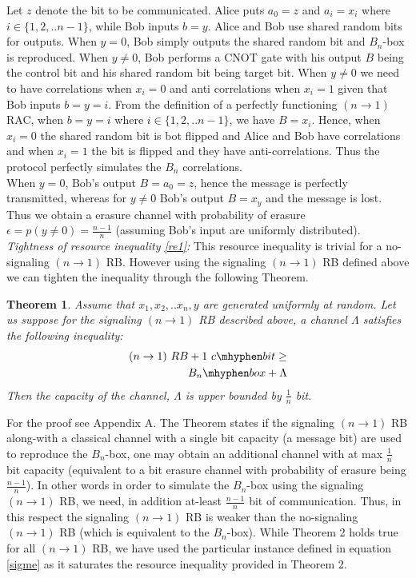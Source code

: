 \documentclass[%
 reprint,
 amsmath,amssymb,
 aps,
]{revtex4-1}
\newtheorem{mydef1}{Theorem}
\begin{document}
Let $z$ denote the bit to be communicated. Alice puts $a_0=z$ and  $a_i=x_i$ where $i\in \{1,2,..n-1\}$, while Bob inputs $b=y$. Alice and Bob use shared random bits for outputs. When $y=0$, Bob simply outputs the shared random bit and $B_n$-box is reproduced. When $y\neq 0$, Bob performs a CNOT gate with his output $B$ being the control bit and his shared random bit being target bit. When $y\neq 0$ we need to have correlations when $x_i=0$ and anti correlations when $x_i=1$ given that Bob inputs $b=y=i$. From the definition of a perfectly functioning $(n\rightarrow 1)$ RAC, when $b=y=i$ where $i\in \{1,2,..n-1\}$, we have $B=x_i$. Hence, when $x_i=0$ the shared random bit is bot flipped and Alice and Bob have correlations and when $x_i=1$ the bit is flipped and they have anti-correlations. Thus the protocol perfectly simulates the $B_n$ correlations.\\
When $y=0$, Bob's output $B=a_0=z$, hence the message is perfectly transmitted, whereas for $y\neq 0$ Bob's output $B=x_y$ and the message is lost. Thus we obtain a erasure channel with probability of erasure  $\epsilon=p(y\neq 0)=\frac{n-1}{n}$ (assuming Bob's input are uniformly distributed). \\
\textit{Tightness of resource inequality \ref{re1}:} This resource inequality is trivial for a no-signaling $(n\rightarrow 1)$ RB. However using the signaling $(n\rightarrow 1)$ RB defined above we can tighten the inequality through the following Theorem.
\begin{mydef1} \label{thm2}
Assume that $x_1,x_2,..x_n,y$ are generated uniformly at random. Let us suppose for the signaling $(n\rightarrow 1)$ RB described above, a channel $\Lambda$ satisfies the following inequality:
\begin{eqnarray} \label{REsh}
(n\rightarrow1)\ RB + 1\  c\mhyphen bit \geq \nonumber \\ B_n\mhyphen box + \Lambda
\end{eqnarray}
Then the capacity of the channel, $\Lambda$ is upper bounded by $\frac{1}{n}$ bit.
\end{mydef1} \label{thm2}
For the proof see Appendix A.  The Theorem states if the signaling $(n \rightarrow 1)$ RB along-with a classical channel with a single bit capacity (a message bit) are used to reproduce the $B_n$-box, one may obtain an additional channel with at max $\frac{1}{n}$ bit capacity (equivalent to a bit erasure channel with probability of erasure being $\frac{n-1}{n}$). In other words in order to simulate the $B_n$-box using the signaling $(n\rightarrow 1)$ RB, we need, in addition at-least $\frac{n-1}{n}$ bit of communication. Thus, in this respect the signaling $(n\rightarrow 1)$ RB is  weaker than the no-signaling $(n\rightarrow 1)$ RB (which is equivalent to the $B_n$-box). While Theorem 2 holds true for all $(n\rightarrow1)$ RB,
we have used the particular instance defined in equation \ref{sigme} as it saturates the resource inequality provided in Theorem 2.
\end{document}
